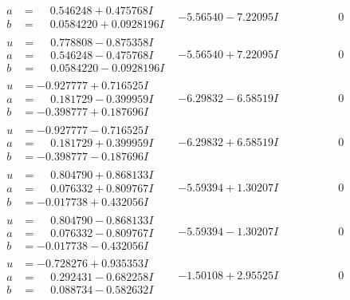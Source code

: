 \documentclass[1p]{elsarticle_modified}
\theoremstyle{definition}
\begin{document}
$$\begin{array}{c|c|c}
\begin{aligned}
a &= \phantom{-}0.546248 + 0.475768 I \\
b &= \phantom{-}0.0584220 + 0.0928196 I\end{aligned}
 & -5.56540 - 7.22095 I & \phantom{-0.000000 } 0 \\ \hline\begin{aligned}
u &= \phantom{-}0.778808 - 0.875358 I \\
a &= \phantom{-}0.546248 - 0.475768 I \\
b &= \phantom{-}0.0584220 - 0.0928196 I\end{aligned}
 & -5.56540 + 7.22095 I & \phantom{-0.000000 } 0 \\ \hline\begin{aligned}
u &= -0.927777 + 0.716525 I \\
a &= \phantom{-}0.181729 - 0.399959 I \\
b &= -0.398777 + 0.187696 I\end{aligned}
 & -6.29832 - 6.58519 I & \phantom{-0.000000 } 0 \\ \hline\begin{aligned}
u &= -0.927777 - 0.716525 I \\
a &= \phantom{-}0.181729 + 0.399959 I \\
b &= -0.398777 - 0.187696 I\end{aligned}
 & -6.29832 + 6.58519 I & \phantom{-0.000000 } 0 \\ \hline\begin{aligned}
u &= \phantom{-}0.804790 + 0.868133 I \\
a &= \phantom{-}0.076332 + 0.809767 I \\
b &= -0.017738 + 0.432056 I\end{aligned}
 & -5.59394 + 1.30207 I & \phantom{-0.000000 } 0 \\ \hline\begin{aligned}
u &= \phantom{-}0.804790 - 0.868133 I \\
a &= \phantom{-}0.076332 - 0.809767 I \\
b &= -0.017738 - 0.432056 I\end{aligned}
 & -5.59394 - 1.30207 I & \phantom{-0.000000 } 0 \\ \hline\begin{aligned}
u &= -0.728276 + 0.935353 I \\
a &= \phantom{-}0.292431 - 0.682258 I \\
b &= \phantom{-}0.088734 - 0.582632 I\end{aligned}
 & -1.50108 + 2.95525 I & \phantom{-0.000000 } 0 \\ \hline\begin{aligned}

\end{aligned}
\end{array}$$
\end{document}

